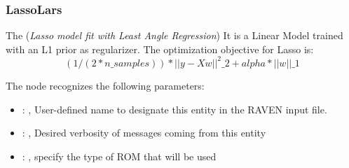 \subsubsection{LassoLars}
  The  (\textit{Lasso model fit with Least Angle Regression})
  It is a Linear Model trained with an L1 prior as regularizer.                         The
  optimization objective for Lasso is:                         \begin{equation}
  (1 / (2 * n\_samples)) * ||y - Xw||^2\_2 + alpha * ||w||\_1                         \end{equation}

  The  node recognizes the following parameters:
    \begin{itemize}
      \item {}: , 
        User-defined name to designate this entity in the RAVEN input file.
      \item {}: , 
        Desired verbosity of messages coming from this entity
      \item {}: , 
        specify the type of ROM that will be used
  \end{itemize}

